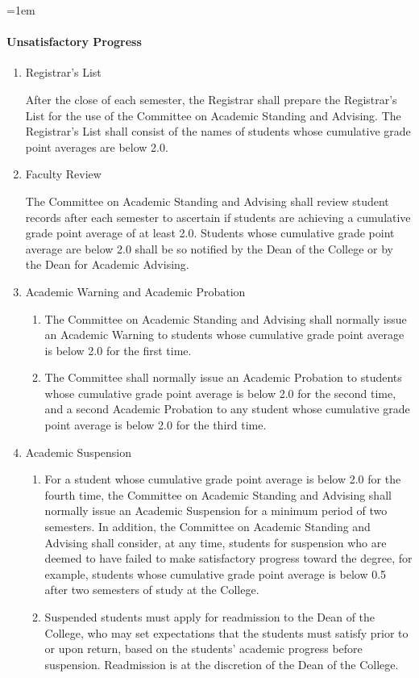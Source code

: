 \documentclass{manual}
\let\oldparagraph\paragraph
\renewcommand\paragraph{\leftskip=1em\oldparagraph}
\newcommand{\itemLevelA}{\alph*.}
\newcommand{\itemLevelB}{\arabic*)}
\newcommand{\itemRefA}{\alph*}
\newcommand{\itemRefB}{\arabic*}
\begin{document}
\paragraph{Unsatisfactory Progress}\label{par:UnsatisfactoryProgress}

\begin{enumerate}[label=\itemLevelA,ref=\itemRefA]
\item Registrar's List 

      After the close of each semester, the Registrar shall prepare the Registrar's List for the use of the        Committee on Academic Standing and Advising. The Registrar's List shall consist of the names of        students whose cumulative grade point averages are below 2.0.

\item Faculty Review         

The Committee on Academic Standing and Advising shall review student records after each semester to ascertain if students are achieving a cumulative grade point average of at least 2.0. Students whose cumulative grade point average are below 2.0 shall be so notified by the Dean of the College or by the Dean for Academic Advising.

\item Academic Warning and Academic Probation        

\begin{enumerate}[label=\itemLevelB,ref=\itemRefB]
\item The Committee on Academic Standing and Advising shall normally issue an Academic Warning to students whose cumulative grade point average is below 2.0 for the first time. 
\item The Committee shall normally issue an Academic Probation to students whose cumulative grade point average is below 2.0 for the second time, and a second Academic Probation to any student whose cumulative grade point average is below 2.0 for the third time. 
\end{enumerate}

\item Academic Suspension

\begin{enumerate}[label=\itemLevelB,ref=\itemRefB]

\item For a student whose cumulative grade point average is below 2.0 for the fourth time, the Committee on Academic Standing and Advising shall normally issue an Academic Suspension for a minimum period of two semesters. In addition, the Committee on Academic Standing and Advising shall consider, at any time, students for suspension who are deemed to have failed to make satisfactory progress toward the degree, for example, students whose cumulative grade point average is below 0.5 after two semesters of study at the College. 
\item Suspended students must apply for readmission to the Dean of the College, who may set expectations that the students must satisfy prior to or upon return, based on the students' academic progress before suspension. Readmission is at the discretion of the Dean of the College.
\end{enumerate}


\end{enumerate}
\end{document}
